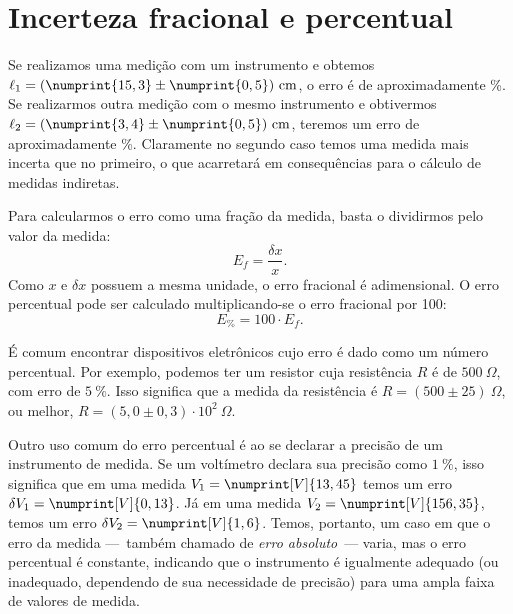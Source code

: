 
\section{Incerteza fracional e percentual}

Se realizamos uma medição com um instrumento e obtemos $\ell_1 = (\numprint{15,3} \pm \numprint{0,5})~\textrm{cm}$, o erro é de aproximadamente \%. Se realizarmos outra medição com o mesmo instrumento e obtivermos $\ell_2 = (\numprint{3,4} \pm \numprint{0,5})~\textrm{cm}$, teremos um erro de aproximadamente \%. Claramente no segundo caso temos uma medida mais incerta que no primeiro, o que acarretará em consequências para o cálculo de medidas indiretas.

Para calcularmos o erro como uma fração da medida, basta o dividirmos pelo valor da medida:
\begin{equation}
	E_f = \frac{\delta x}{x}.
\end{equation}
%
Como $x$ e $\delta x$ possuem a mesma unidade, o erro fracional é adimensional. O erro percentual pode ser calculado multiplicando-se o erro fracional por 100:
\begin{equation}
	E_\% = 100 \cdot E_f.
\end{equation}

É comum encontrar dispositivos eletrônicos cujo erro é dado como um número percentual. Por exemplo, podemos ter um resistor cuja resistência $R$ é de $500~\Omega$, com erro de $5~\%$. Isso significa que a medida da resistência é $R = (500 \pm 25)~\Omega$, ou melhor, $R = (5,0 \pm 0,3)\cdot 10^2~\Omega$. 

Outro uso comum do erro percentual é ao se declarar a precisão de um instrumento de medida. Se um voltímetro declara sua precisão como $1~\%$, isso significa que em uma medida $V_1 = \numprint[V]{13,45}$ temos um erro  $\delta V_1 = \numprint[V]{0,13}$. Já em uma medida $V_2 = \numprint[V]{156,35}$, temos um erro $\delta V_2 = \numprint[V]{1,6}$. Temos, portanto, um caso em que o erro da medida ---~também chamado de \emph{erro absoluto}~--- varia, mas o erro percentual é constante, indicando que o instrumento é igualmente adequado (ou inadequado, dependendo de sua necessidade de precisão) para uma ampla faixa de valores de medida.

